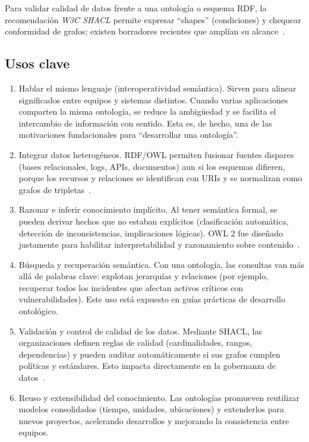 Para validar calidad de datos frente a una ontología o esquema RDF, la recomendación \textit{W3C SHACL} permite expresar “shapes” (condiciones) y chequear conformidad de grafos; existen borradores recientes que amplían su alcance~\parencite{W3C2017SHACL}.

\subsection{Usos clave}

\begin{enumerate}
    \item Hablar el mismo lenguaje (interoperatividad semántica).
    Sirven para alinear significados entre equipos y sistemas distintos. Cuando varias aplicaciones comparten la misma ontología, se reduce la ambigüedad y se facilita el intercambio de información con sentido. Esta es, de hecho, una de las motivaciones fundacionales para “desarrollar una ontología”. 

    \item Integrar datos heterogéneos.
    RDF/OWL permiten fusionar fuentes dispares (bases relacionales, logs, APIs, documentos) aun si los esquemas difieren, porque los recursos y relaciones se identifican con URIs y se normalizan como grafos de tripletas~\parencite{W3C2014RDF}.

    \item Razonar e inferir conocimiento implícito.
    Al tener semántica formal, se pueden derivar hechos que no estaban explícitos (clasificación automática, detección de inconsistencias, implicaciones lógicas). OWL 2 fue diseñado justamente para habilitar interpretabilidad y razonamiento sobre contenido~\parencite{BaaderDLHB02}.

    \item Búsqueda y recuperación semántica.
    Con una ontología, las consultas van más allá de palabras clave: explotan jerarquías y relaciones (por ejemplo, recuperar todos los incidentes que afectan activos críticos con vulnerabilidades). Este uso está expuesto en guías prácticas de desarrollo ontológico. 

    \item Validación y control de calidad de los datos.
    Mediante SHACL, las organizaciones definen reglas de calidad (cardinalidades, rangos, dependencias) y pueden auditar automáticamente si sus grafos cumplen políticas y estándares. Esto impacta directamente en la gobernanza de datos~\parencite{Knublauch2017SHACL}.

    \item Reuso y extensibilidad del conocimiento.
    Las ontologías promueven reutilizar modelos consolidados (tiempo, unidades, ubicaciones) y extenderlos para nuevos proyectos, acelerando desarrollos y mejorando la consistencia entre equipos. 
\end{enumerate}

